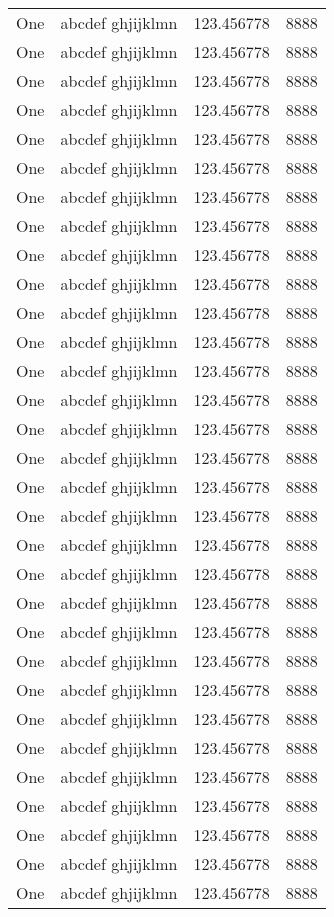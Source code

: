 \begin{center}
\begin{longtable}{| c | L{4cm} | L{6cm} | L{4cm} |}
One & abcdef ghjijklmn & 123.456778 & 8888 \\
One & abcdef ghjijklmn & 123.456778 & 8888 \\
One & abcdef ghjijklmn & 123.456778 & 8888 \\
One & abcdef ghjijklmn & 123.456778 & 8888 \\
One & abcdef ghjijklmn & 123.456778 & 8888 \\
One & abcdef ghjijklmn & 123.456778 & 8888 \\
One & abcdef ghjijklmn & 123.456778 & 8888 \\
One & abcdef ghjijklmn & 123.456778 & 8888 \\
One & abcdef ghjijklmn & 123.456778 & 8888 \\
One & abcdef ghjijklmn & 123.456778 & 8888 \\
One & abcdef ghjijklmn & 123.456778 & 8888 \\
One & abcdef ghjijklmn & 123.456778 & 8888 \\
One & abcdef ghjijklmn & 123.456778 & 8888 \\
One & abcdef ghjijklmn & 123.456778 & 8888 \\
One & abcdef ghjijklmn & 123.456778 & 8888 \\
One & abcdef ghjijklmn & 123.456778 & 8888 \\
One & abcdef ghjijklmn & 123.456778 & 8888 \\
One & abcdef ghjijklmn & 123.456778 & 8888 \\
One & abcdef ghjijklmn & 123.456778 & 8888 \\
One & abcdef ghjijklmn & 123.456778 & 8888 \\
One & abcdef ghjijklmn & 123.456778 & 8888 \\
One & abcdef ghjijklmn & 123.456778 & 8888 \\
One & abcdef ghjijklmn & 123.456778 & 8888 \\
One & abcdef ghjijklmn & 123.456778 & 8888 \\
One & abcdef ghjijklmn & 123.456778 & 8888 \\
One & abcdef ghjijklmn & 123.456778 & 8888 \\
One & abcdef ghjijklmn & 123.456778 & 8888 \\
One & abcdef ghjijklmn & 123.456778 & 8888 \\
One & abcdef ghjijklmn & 123.456778 & 8888 \\
One & abcdef ghjijklmn & 123.456778 & 8888 \\
One & abcdef ghjijklmn & 123.456778 & 8888 \\

\end{longtable}
\end{center}
